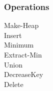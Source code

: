 \subsubsection{Operations}


\begin{description}
\item[Make-Heap]
\item[Insert]
\item[Minimum]
\item[Extract-Min]
\item[Union]
\item[DecreaseKey]
\item[Delete]
\end{description}